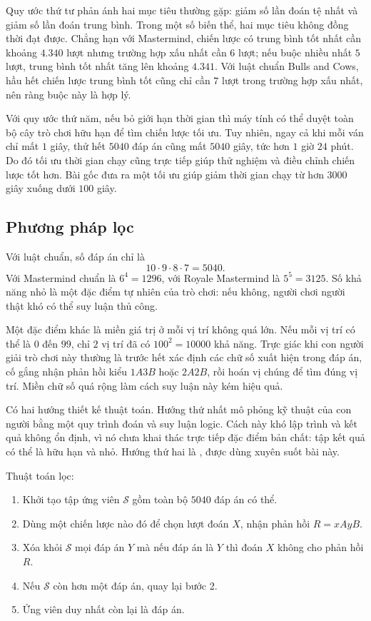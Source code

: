 \documentclass[11pt]{article}
\newcommand{\AB}[2]{#1A#2B}
\newcommand{\SetS}{\mathcal{S}}
\begin{document}
Quy ước thứ tư phản ánh hai mục tiêu thường gặp: giảm số lần đoán tệ nhất và
giảm số lần đoán trung bình. Trong một số biến thể, hai mục tiêu không đồng
thời đạt được. Chẳng hạn với Mastermind, chiến lược có trung bình tốt nhất cần
khoảng \(4.340\) lượt nhưng trường hợp xấu nhất cần \(6\) lượt; nếu buộc nhiều
nhất \(5\) lượt, trung bình tốt nhất tăng lên khoảng \(4.341\). Với luật chuẩn
Bulls and Cows, hầu hết chiến lược trung bình tốt cũng chỉ cần \(7\) lượt
trong trường hợp xấu nhất, nên ràng buộc này là hợp lý.

Với quy ước thứ năm, nếu bỏ giới hạn thời gian thì máy tính có thể duyệt toàn
bộ cây trò chơi hữu hạn để tìm chiến lược tối ưu. Tuy nhiên, ngay cả khi mỗi
ván chỉ mất \(1\) giây, thử hết \(5040\) đáp án cũng mất \(5040\) giây, tức
hơn \(1\) giờ \(24\) phút. Do đó tối ưu thời gian chạy cũng trực tiếp giúp
thử nghiệm và điều chỉnh chiến lược tốt hơn. Bài gốc đưa ra một tối ưu giúp
giảm thời gian chạy từ hơn \(3000\) giây xuống dưới \(100\) giây.

\subsection{Phương pháp lọc}

Với luật chuẩn, số đáp án chỉ là
\[
  10\cdot 9\cdot 8\cdot 7 = 5040.
\]
Với Mastermind chuẩn là \(6^4=1296\), với Royale Mastermind là \(5^5=3125\).
Số khả năng nhỏ là một đặc điểm tự nhiên của trò chơi: nếu không, người chơi
người thật khó có thể suy luận thủ công.

Một đặc điểm khác là miền giá trị ở mỗi vị trí không quá lớn. Nếu mỗi vị trí
có thể là \(0\) đến \(99\), chỉ \(2\) vị trí đã có \(100^2=10000\) khả năng.
Trực giác khi con người giải trò chơi này thường là trước hết xác định các chữ
số xuất hiện trong đáp án, cố gắng nhận phản hồi kiểu \(\AB{1}{3}\) hoặc
\(\AB{2}{2}\), rồi hoán vị chúng để tìm đúng vị trí. Miền chữ số quá rộng làm
cách suy luận này kém hiệu quả.

Có hai hướng thiết kế thuật toán. Hướng thứ nhất mô phỏng kỹ thuật của con
người bằng một quy trình đoán và suy luận logic. Cách này khó lập trình và kết
quả không ổn định, vì nó chưa khai thác trực tiếp đặc điểm bản chất: tập kết
quả có thể là hữu hạn và nhỏ. Hướng thứ hai là , được
dùng xuyên suốt bài này.

Thuật toán lọc:
\begin{enumerate}
  \item Khởi tạo tập ứng viên \(\SetS\) gồm toàn bộ \(5040\) đáp án có thể.
  \item Dùng một chiến lược nào đó để chọn lượt đoán \(X\), nhận phản hồi
  \(R=xAyB\).
  \item Xóa khỏi \(\SetS\) mọi đáp án \(Y\) mà nếu đáp án là \(Y\) thì đoán
  \(X\) không cho phản hồi \(R\).
  \item Nếu \(\SetS\) còn hơn một đáp án, quay lại bước 2.
  \item Ứng viên duy nhất còn lại là đáp án.
\end{enumerate}
\end{document}

